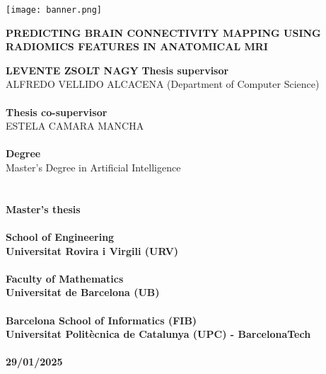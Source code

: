 \begin{titlepage}
    \begin{center}
        \begingroup
          \let\clearpage\relax
          \texttt{[image: banner.png]}
          \vfill
          \LARGE
          \begin{center}
          \textbf{\MakeUppercase{Predicting Brain Connectivity Mapping Using Radiomics Features in Anatomical MRI}}
          \end{center}
          \vfill
          \large
          \textbf{\MakeUppercase{Levente Zsolt Nagy}}
          \vfill
          \normalsize
          \textbf{Thesis supervisor}\\
          \MakeUppercase{Alfredo Vellido Alcacena} (Department of Computer Science)\\
          \hfill\\
          \textbf{Thesis co-supervisor}\\
          \MakeUppercase{Estela Camara Mancha}\\
          \hfill\\
          \textbf{Degree}\\
          Master's Degree in Artificial Intelligence\\
          \hfill\\\hfill\\
          \textbf{Master's thesis}\\
          \hfill\\
          \textbf{School of Engineering}\\
          \textbf{Universitat Rovira i Virgili (URV)}\\
          \hfill\\
          \textbf{Faculty of Mathematics}\\
          \textbf{Universitat de Barcelona (UB)}\\
          \hfill\\
          \textbf{Barcelona School of Informatics (FIB)}\\
          \textbf{Universitat Politècnica de Catalunya (UPC) - BarcelonaTech}\\
          \hfill\\
          \textbf{29/01/2025}\\
        \endgroup
    \end{center}
\end{titlepage}